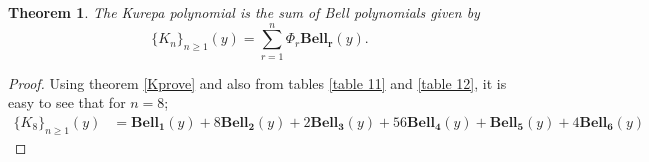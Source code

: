 \documentclass[pdflatex,sn-mathphys-num]{sn-jnl}%
\newtheorem{theorem}{Theorem}
\theoremstyle{thmstyleone}%
\theoremstyle{thmstyletwo}%
\theoremstyle{thmstylethree}%
\begin{document}


\begin{theorem}
The Kurepa polynomial is the sum of Bell polynomials given by
$$\lbrace K_n\rbrace_{n\geq 1}(y)=\sum_{r=1}^{n} \Phi_r \mathbf{Bell_r}(y).$$    
\end{theorem}
\begin{proof}
    Using theorem \ref{Kprove} and also from tables \ref{table 11} and \ref{table 12}, it is easy to see that for $n=8$;
    \begin{align*}
     \lbrace K_8\rbrace_{n\geq 1}(y) &= \mathbf{Bell_1}(y) + 8 \mathbf{Bell_2}(y)  + 2 \mathbf{Bell_3}(y) + 56\mathbf{Bell_4}(y) + \mathbf{Bell_5}(y) + 4\mathbf{Bell_6}(y) 
\end{align*}
\end{proof}
\end{document}
